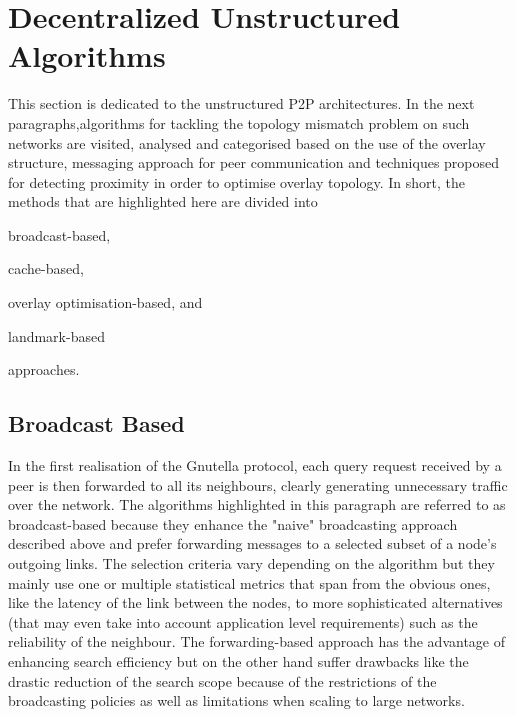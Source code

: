 \section{Decentralized Unstructured Algorithms}
\label{section:unstructured}

This section is dedicated to the unstructured P2P architectures. In the next
paragraphs,algorithms for tackling the topology mismatch problem on such
networks are visited, analysed and categorised based on the use of the overlay
structure, messaging approach for peer communication and techniques proposed for
detecting proximity in order to optimise overlay topology. In short, the methods
that are highlighted here are divided into
\begin{inparaenum}
  \item broadcast-based,
  \item cache-based,
  \item overlay optimisation-based, and
  \item landmark-based
\end{inparaenum}
 approaches.



\subsection{Broadcast Based}

In the first realisation of the Gnutella protocol, each query request received
by a peer is then forwarded to all its neighbours, clearly generating
unnecessary traffic over the network. The algorithms highlighted in this
paragraph are referred to as broadcast-based because they enhance the "naive"
broadcasting approach described above and prefer forwarding messages to a
selected subset of a node's outgoing links. The selection criteria vary
depending on the algorithm but they mainly use one or multiple statistical
metrics that span from the obvious ones, like the latency of the link between
the nodes, to more sophisticated alternatives (that may even take into account
application level requirements) such as the reliability of the neighbour. The
forwarding-based approach has the advantage of enhancing search efficiency but
on the other hand suffer drawbacks like the drastic reduction of the search
scope because of the restrictions of the broadcasting policies as well as
limitations when scaling to large networks.

